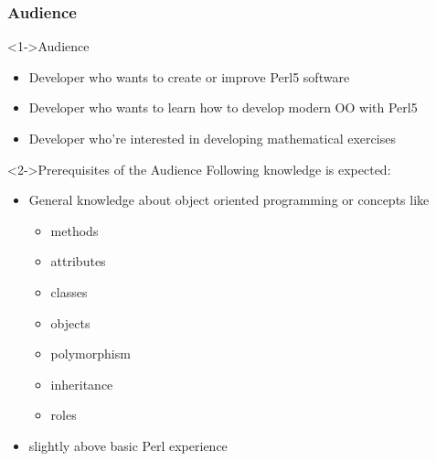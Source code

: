 \documentclass[ngerman,xcolor={table,dvipsnames},scriptsizeer,compress,hyperref={bookmarks,colorlinks}]{beamer}
\begin{document}
\small
\begin{frame}[fragile]
\frametitle{Audience}
\begin{block}<1->{Audience}
\begin{itemize}
\item Developer who wants to create or improve Perl5 software
\item Developer who wants to learn how to develop modern OO with Perl5
\item Developer who're interested in developing mathematical exercises
\end{itemize}
\end{block}

\begin{block}<2->{Prerequisites of the Audience}
Following knowledge is expected:
\begin{itemize}
\item General knowledge about object oriented programming or concepts like
      \begin{itemize}
      \item methods
      \item attributes
      \item classes
      \item objects
      \item polymorphism
      \item inheritance
      \item roles
      \end{itemize}
\item slightly above basic Perl experience
\end{itemize}
\end{block}
\end{frame}
\end{document}
